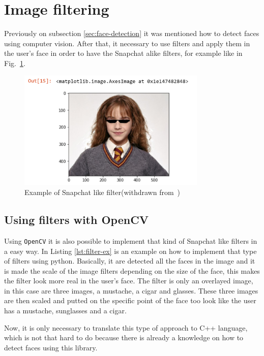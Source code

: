 %
\section{Image filtering}
\label{sec:image-filtering}
Previously on subsection \ref{sec:face-detection} it was mentioned how to detect faces using computer vision. After that, it necessary to use filters and apply them in the user's face in order to have the Snapchat alike filters, for example like in Fig.~\ref{fig:snapchat-filter}.
%
\begin{figure}[!hbt]
\centering
    \includegraphics[width=0.8\textwidth]{./img/snapchat-filter.png}
  \caption{Example of Snapchat like filter(withdrawn from~\cite{snapchat-filter})}%
\label{fig:snapchat-filter}
\end{figure}

\subsection{Using filters with OpenCV}
\label{sec:filter-opencv}

Using \texttt{OpenCV} it is also possible to implement that kind of Snapchat like filters in a easy way.
In Listing \ref{lst:filter-ex} is an example on how to implement that type of filters using python.
Basically, it are detected all the faces in the image and it is made the scale of the image filters depending on the size of the face, this makes the filter look more real in the user's face.
The filter is only an overlayed image, in this case are three images, a mustache, a cigar and glasses. These three images are then scaled and putted on the specific point of the face too look like the user has a mustache, sunglasses and a cigar.
%


Now, it is only necessary to translate this type of approach to C++ language, which is not that hard to do because there is already a knowledge on how to detect faces using this library. 
